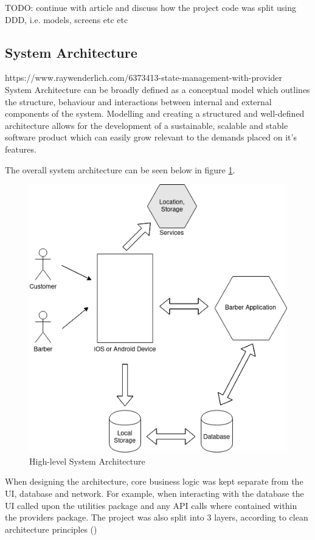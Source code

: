 \documentclass[12pt]{article}
\begin{document}
	TODO: continue with article	and discuss how the project code was split using DDD, i.e. models, screens etc etc
	
	\subsection{System Architecture}
	https://www.raywenderlich.com/6373413-state-management-with-provider
	System Architecture can be broadly defined as a conceptual model which outlines the structure, behaviour and interactions between internal and external components of the system. Modelling and creating a structured and well-defined architecture allows for the development of a sustainable, scalable and stable software product which can easily grow relevant to the demands placed on it's features.
	
	The overall system architecture can be seen below in figure \ref{fig:system-architecture}.
	
	\begin{figure}[H]
		\centering
		\includegraphics[scale=0.7]{images/system-architecture.png}
		\caption{High-level System Architecture}
		\label{fig:system-architecture}
	\end{figure}
	
	When designing the architecture, core business logic was kept separate from the UI, database and network. For example, when interacting with the database the UI called upon the utilities package and any API calls where contained within the providers package. The project was also split into 3 layers, according to clean architecture principles (\cite{martinRapidApplicationDevelopment1991})
	
\end{document}
